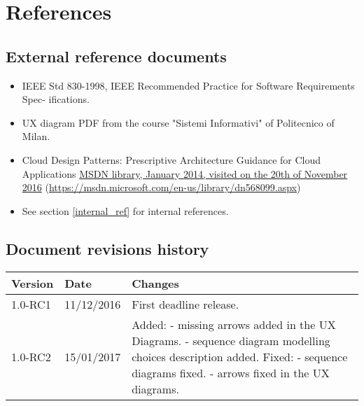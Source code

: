 \section{References}

\subsection{External reference documents}
\label{external_ref}
\begin{itemize}
    \item IEEE Std 830-1998, IEEE Recommended Practice for Software Requirements Spec- ifications.
    \item UX diagram PDF from the course "Sistemi Informativi" of Politecnico of Milan.
    \item Cloud Design Patterns: Prescriptive Architecture Guidance for Cloud Applications \href{https://msdn.microsoft.com/en-us/library/dn568099.aspx}{MSDN library, January 2014, visited on the 20th of November 2016} (\url{https://msdn.microsoft.com/en-us/library/dn568099.aspx})
    \item See section \ref{internal_ref} for internal references.
\end{itemize}



\subsection{Document revisions history}
\begin{tabular}{| l | l | p{10cm} |}
\hline
\textbf{Version} & \textbf{Date} & \textbf{Changes}\\
\hline
1.0-RC1 & 11/12/2016 & First deadline release.\\
\hline
1.0-RC2 & 15/01/2017 & Added:\newline
    - missing arrows added in the UX Diagrams.\newline
    - sequence diagram modelling choices description added.\newline
    Fixed:\newline
    - sequence diagrams fixed.\newline
    - arrows fixed in the UX diagrams.\\
\hline
\end{tabular} 
